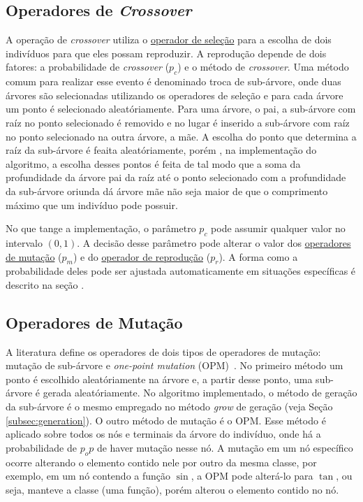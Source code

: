 \documentclass[a4paper]{paper}
\begin{document}
\subsection{Operadores de \textit{Crossover}} \label{subsec:crossover}

A operação de \textit{crossover} utiliza o \hyperref[subsec:selection]{operador
  de seleção} para a escolha de dois indivíduos para que eles possam
reproduzir. A reprodução depende de dois fatores: a probabilidade de
\textit{crossover} ($p_c$) e o método de \textit{crossover}.  Uma método comum
para realizar esse evento é denominado troca de sub-árvore, onde duas árvores
são selecionadas utilizando os operadores de seleção e para cada árvore um ponto
é selecionado aleatóriamente. Para uma árvore, o pai, a sub-árvore com raíz no
ponto selecionado é removido e no lugar é inserido a sub-árvore com raíz no
ponto selecionado na outra árvore, a mãe. A escolha do ponto que determina a
raíz da sub-árvore é feaita aleatóriamente, porém , na implementação do
algoritmo, a escolha desses pontos é feita de tal modo que a soma da
profundidade da árvore pai da raíz até o ponto selecionado com a profundidade da
sub-árvore oriunda dá árvore mãe não seja maior de que o comprimento máximo que
um indivíduo pode possuir.

No que tange a implementação, o parâmetro $p_c$ pode assumir qualquer valor no
intervalo $(0, 1)$. A decisão desse parâmetro pode alterar o valor dos
\hyperref[subsec:mutation]{operadores de mutação} ($p_m$) e do
\hyperref[subsec:reproduction]{operador de reprodução} ($p_r$). A forma como a
probabilidade deles pode ser ajustada automaticamente em situações específicas é
descrito na seção .

\subsection{Operadores de Mutação} \label{subsec:mutation}

A literatura define os operadores de dois tipos de operadores de mutação:
mutação de sub-árvore e \textit{one-point mutation} (OPM)~\citep{poli2008}. No
primeiro método um ponto é escolhido aleatóriamente na árvore e, a partir desse
ponto, uma sub-árvore é gerada aleatóriamente. No algoritmo implementado, o
método de geração da sub-árvore é o mesmo empregado no método \textit{grow} de
geração (veja Seção \ref{subsec:generation}). O outro método de mutação é o
OPM. Esse método é aplicado sobre todos os nós e terminais da árvore do
indivíduo, onde há a probabilidade de $p_op$ de haver mutação nesse nó. A
mutação em um nó específico ocorre alterando o elemento contido nele por outro
da mesma classe, por exemplo, em um nó contendo a função $\sin$, a OPM pode
alterá-lo para $\tan$, ou seja, manteve a classe (uma função), porém alterou o
elemento contido no nó.
\end{document}
